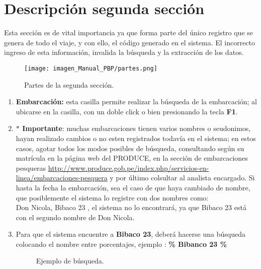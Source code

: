 \documentclass[a4paper,oneside,11pt]{book}
\begin{document}
\section{Descripción segunda sección}

Esta sección es de vital importancia ya que forma parte del único registro que se genera de todo el viaje, y con ello, el código generado en el sistema. El incorrecto ingreso de esta información, invalida la búsqueda y la extracción de los datos.
 \begin{figure} [!h]
 	\begin{center}
 		\texttt{[image: imagen\_Manual\_PBP/partes.png]}
 		\caption{Partes de la segunda sección.}
 	\end{center}
 \end{figure}

 
 \begin{enumerate}
 \item\textbf{ Embarcación:} esta casilla permite realizar la búsqueda de la embarcación; al ubicarse en la casilla, con un doble click o bien presionando la tecla \textbf{F1}.
 
 \item [] \textbf{$\ast$ Importante}: muchas embarcaciones tienen varios nombres o seudonimos, hayan realizado cambios o no esten registrados todavía en el sistema; en estos casos, agotar todos los modos posibles de búsqueda, consultando según su matrícula en la página web del PRODUCE, en la sección de embarcaciones pesqueras \url{http://www.produce.gob.pe/index.php/servicios-en-linea/embarcaciones-pesquera} y por último colsultar al analista encargado.
 Si hasta la fecha la embarcación, sea el caso de que haya cambiado de nombre, que posiblemente el sistema lo registre con dos nombres como:   \\ Don Nicola, Bibaco 23 , el sistema no lo encontrará, ya que Bibaco 23 está con el segundo nombre de Don Nicola.\\
\item [] Para que el sistema encuentre a \textbf{Bibaco 23}, deberá hacerse una búsqueda colocando el nombre entre porcentajes, ejemplo :
 \textbf{ \% Bibanco 23 \%}
 
 \begin{figure}[htbp]
 	\centering
  	\caption{Ejemplo de búsqueda.}
 	\vspace{-10pt}
 \end{figure}
 

\end{enumerate}
\end{document}
